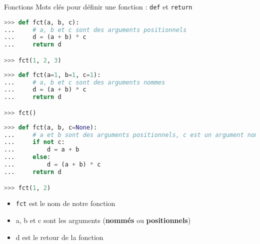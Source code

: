 \begin{frame}[fragile]{Fonctions}
  Mots clés pour définir une fonction : \texttt{def} et \texttt{return}

  \begin{overprint}
    
\begin{lstlisting}[language=Python, morekeywords={}, numbers=none]
>>> def fct(a, b, c):
...     # a, b et c sont des arguments positionnels
...     d = (a + b) * c
...     return d

>>> fct(1, 2, 3)
\end{lstlisting}

\begin{lstlisting}[language=Python, morekeywords={}, numbers=none]
>>> def fct(a=1, b=1, c=1):
...     # a, b et c sont des arguments nommes
...     d = (a + b) * c
...     return d

>>> fct()
\end{lstlisting}

\begin{lstlisting}[language=Python, morekeywords={}, numbers=none]
>>> def fct(a, b, c=None):
...     # a et b sont des arguments positionnels, c est un argument nomme
...     if not c:
...         d = a + b
...     else:
...         d = (a + b) * c
...     return d

>>> fct(1, 2)
\end{lstlisting}
    
  
  \end{overprint}

    \begin{itemize}
      \item \texttt{fct} est le nom de notre fonction
      \item a, b et c sont les arguments (\textbf{nommés} ou \textbf{positionnels})
      \item d est le retour de la fonction
    \end{itemize}

\end{frame}
  


